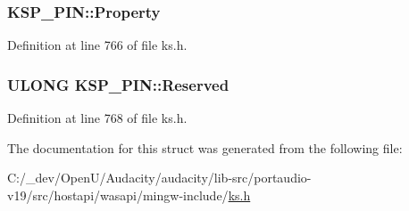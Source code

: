 \subsubsection[{\texorpdfstring{Property}{Property}}]{ K\+S\+P\+\_\+\+P\+I\+N\+::\+Property}\hypertarget{struct_k_s_p___p_i_n_a69ef465f32c95fd3a8423710adcbe9bd}{}\label{struct_k_s_p___p_i_n_a69ef465f32c95fd3a8423710adcbe9bd}


Definition at line 766 of file ks.\+h.

\subsubsection[{\texorpdfstring{Reserved}{Reserved}}]{\setlength{\rightskip}{0pt plus 5cm}U\+L\+O\+NG K\+S\+P\+\_\+\+P\+I\+N\+::\+Reserved}\hypertarget{struct_k_s_p___p_i_n_a6823174c71751e5a1cb4a0020ddeed1d}{}\label{struct_k_s_p___p_i_n_a6823174c71751e5a1cb4a0020ddeed1d}


Definition at line 768 of file ks.\+h.



The documentation for this struct was generated from the following file\+:\begin{DoxyCompactItemize}
\item 
C\+:/\+\_\+dev/\+Open\+U/\+Audacity/audacity/lib-\/src/portaudio-\/v19/src/hostapi/wasapi/mingw-\/include/\hyperlink{ks_8h}{ks.\+h}\end{DoxyCompactItemize}
